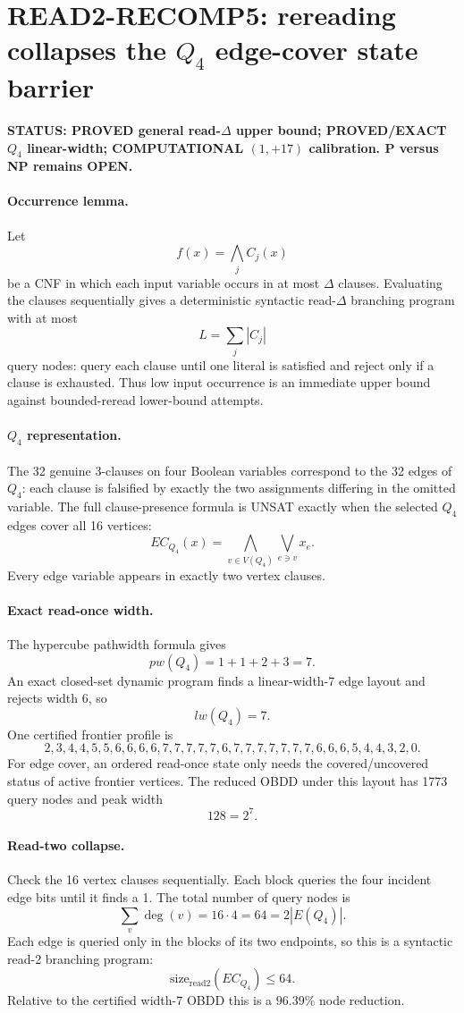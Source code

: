 \section*{READ2-RECOMP5: rereading collapses the $Q_4$ edge-cover state barrier}

\textbf{STATUS: PROVED general read-$\Delta$ upper bound; PROVED/EXACT $Q_4$ linear-width; COMPUTATIONAL $(1,+17)$ calibration. P versus NP remains OPEN.}

\paragraph{Occurrence lemma.}
Let
\[
f(x)=\bigwedge_j C_j(x)
\]
be a CNF in which each input variable occurs in at most $\Delta$ clauses.  Evaluating the
clauses sequentially gives a deterministic syntactic read-$\Delta$ branching program with at
most
\[
L=\sum_j |C_j|
\]
query nodes: query each clause until one literal is satisfied and reject only if a clause is
exhausted.  Thus low input occurrence is an immediate upper bound against bounded-reread
lower-bound attempts.

\paragraph{$Q_4$ representation.}
The 32 genuine 3-clauses on four Boolean variables correspond to the 32 edges of $Q_4$:
each clause is falsified by exactly the two assignments differing in the omitted variable.
The full clause-presence formula is UNSAT exactly when the selected $Q_4$ edges cover all 16
vertices:
\[
EC_{Q_4}(x)=\bigwedge_{v\in V(Q_4)}\bigvee_{e\ni v}x_e.
\]
Every edge variable appears in exactly two vertex clauses.

\paragraph{Exact read-once width.}
The hypercube pathwidth formula gives
\[
pw(Q_4)=1+1+2+3=7.
\]
An exact closed-set dynamic program finds a linear-width-7 edge layout and rejects width 6,
so
\[
\boxed{lw(Q_4)=7}.
\]
One certified frontier profile is
\[
2,3,4,4,5,5,6,6,6,6,7,7,7,7,7,6,
7,7,7,7,7,7,7,6,6,6,5,4,4,3,2,0.
\]
For edge cover, an ordered read-once state only needs the covered/uncovered status of active
frontier vertices.  The reduced OBDD under this layout has 1773 query nodes and peak width
\[
\boxed{128=2^7}.
\]

\paragraph{Read-two collapse.}
Check the 16 vertex clauses sequentially.  Each block queries the four incident edge bits
until it finds a 1.  The total number of query nodes is
\[
\sum_v \deg(v)=16\cdot4=64=2|E(Q_4)|.
\]
Each edge is queried only in the blocks of its two endpoints, so this is a syntactic read-2
branching program:
\[
\boxed{\mathrm{size}_{\mathrm{read2}}(EC_{Q_4})\le64}.
\]
Relative to the certified width-7 OBDD this is a $96.39\%$ node reduction.

